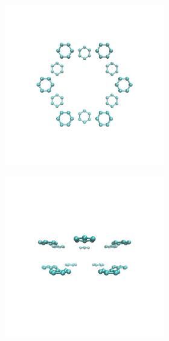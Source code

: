 \documentclass{article}
\begin{document}
\graphicspath{{./figures/}}

\begin{figure}[ht] 
\centering
    \begin{subfigure}{0.2\textwidth}
        \centering	
        \begin{subfigure}{\textwidth}
	    \centering
            \includegraphics[width=\linewidth]{topoffset.png}
    	\end{subfigure}%

    	\begin{subfigure}{\textwidth} 
	    \centering
            \includegraphics[width=\linewidth]{sideoffset.png}
    	\end{subfigure}%
    

\end{subfigure}
\end{figure}
\end{document}

